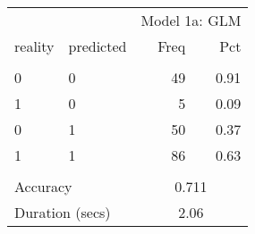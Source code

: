 \begin{tabular}{llrr}
   \toprule 
 & & \multicolumn{2}{l}{Model 1a: GLM} 
                        \\ 
 \cmidrule(lr){3-4} 
                        
  reality & predicted & 
                        Freq & Pct 
                        \\ \hline \\[-1.8ex]  
 0 & 0 &  49 & 0.91 \\ 
  1 & 0 &   5 & 0.09 \\ 
  0 & 1 &  50 & 0.37 \\ 
  1 & 1 &  86 & 0.63 \\ 
   \hline \\[-1.8ex]  

                   \multicolumn{2}{l}{Accuracy} & 
                   \multicolumn{2}{c}{0.711}
                   \\ 
 
                   \multicolumn{2}{l}{Duration (secs)} & 
                   \multicolumn{2}{c}{2.06}
                   \\ 
 \bottomrule 
\end{tabular}
